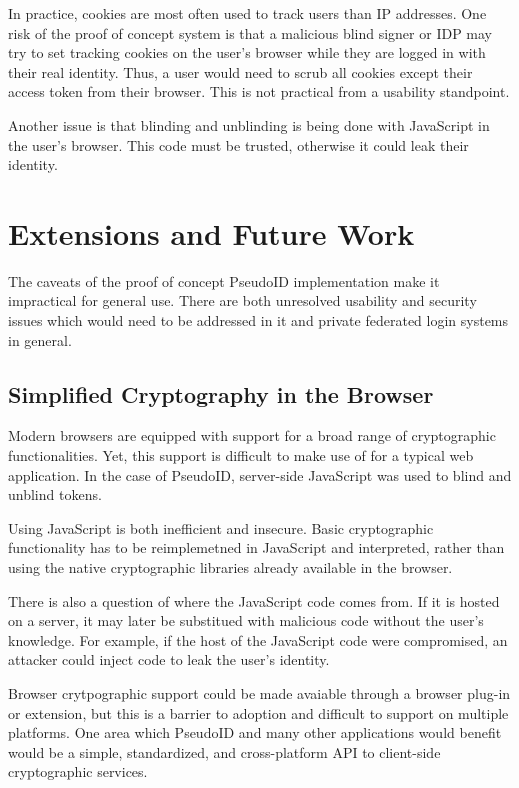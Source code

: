 \documentclass{llncs}
\begin{document}
In practice, cookies are most often used to track users than IP
addresses. One risk of the proof of concept system is that a malicious
blind signer or IDP may try to set tracking cookies on the user's
browser while they are logged in with their real identity. Thus, a
user would need to scrub all cookies except their access token from
their browser. This is not practical from a usability standpoint.

Another issue is that blinding and unblinding is being done with
JavaScript in the user's browser. This code must be trusted, otherwise
it could leak their identity. 

\section{Extensions and Future Work}

The caveats of the proof of concept PseudoID implementation make it
impractical for general use. There are both unresolved usability and
security issues which would need to be addressed in it and private
federated login systems in general.

\subsection{Simplified Cryptography in the Browser}

Modern browsers are equipped with support for a broad range of
cryptographic functionalities. Yet, this support is difficult to make
use of for a typical web application. In the case of PseudoID,
server-side JavaScript was used to blind and unblind tokens.

Using JavaScript is both inefficient and insecure. Basic cryptographic
functionality has to be reimplemetned in JavaScript and interpreted,
rather than using the native cryptographic libraries already available
in the browser.

There is also a question of where the JavaScript code comes from. If
it is hosted on a server, it may later be substitued with malicious
code without the user's knowledge. For example, if the host of the
JavaScript code were compromised, an attacker could inject code to
leak the user's identity.

Browser crytpographic support could be made avaiable through
a browser plug-in or extension, but this is a barrier to adoption and
difficult to support on multiple platforms. One area which PseudoID
and many other applications would benefit would be a simple,
standardized, and cross-platform API to client-side cryptographic
services.
\end{document}
